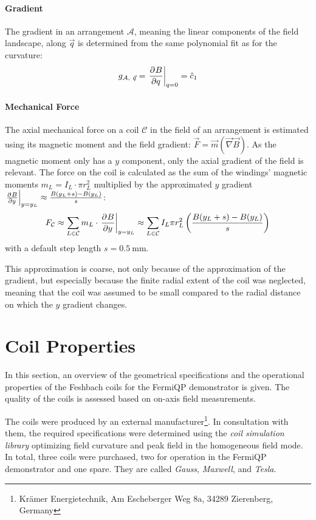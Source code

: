 \paragraph{Gradient}
The gradient in an arrangement $\mathcal{A}$, meaning the linear components of the field landscape, along $\vec q$ is determined from the same polynomial fit as for the curvature:
\begin{align}\label{eq:gradient_simulation}
    g_{\mathcal{A},~\vec q} = \eval{\pdv[]{B}{q}}_{q = 0} = \hat c_1
\end{align}

\paragraph{Mechanical Force}
The axial mechanical force on a coil $\mathcal{C}$ in the field of an arrangement is estimated using its magnetic moment and the field gradient: $\vec F = \vec m (\vec \nabla \vec B)$. As the magnetic moment only has a $y$ component, only the axial gradient of the field is relevant. The force on the coil is calculated as the sum of the windings' magnetic moments $m_L = I_L \cdot \pi r_L^2$ multiplied by the approximated $y$ gradient $\eval{\pdv[]{B}{y}}_{y = y_L} \approx \frac{B(y_L + s) - B(y_L)}{s}$:
\begin{align}\label{eq:mechanical_force_simulation}
    F_\mathcal{C} \approx \sum\limits_{L \in \mathcal{C}} m_L \cdot \eval{\pdv[]{B}{y}}_{y = y_L} \approx \sum\limits_{L \in \mathcal{C}} I_L \pi r_L^2 \left(\frac{B(y_L + s)-B(y_L)}{s}\right)
\end{align}
with a default step length $s = \SI{0.5}{\milli\meter}$.

This approximation is coarse, not only because of the approximation of the gradient, but especially because the finite radial extent of the coil was neglected, meaning that the coil was assumed to be small compared to the radial distance on which the $y$ gradient changes.




\section{Coil Properties}\label{ch:coil_properties}
In this section, an overview of the geometrical specifications and the operational properties of the Fesh\-bach coils for the FermiQP demonstrator is given. The quality of the coils is assessed based on on-axis field measurements.

The coils were produced by an external manufacturer\footnote{Krämer Energietechnik, Am Escheberger Weg 8a, 34289 Zierenberg, Germany}. In consultation with them, the required specifications were determined using the \textit{coil simulation library} optimizing field curvature and peak field in the homogeneous field mode. In total, three coils were purchased, two for operation in the FermiQP demonstrator and one spare. They are called \textit{Gauss}, \textit{Maxwell}, and \textit{Tesla}.

